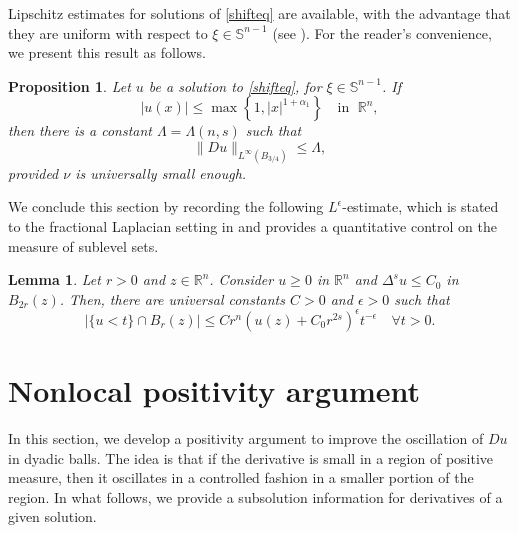 \documentclass[reqno,11pt]{amsart}
\newtheorem{lemma}{Lemma}[section]
\newtheorem{proposition}{Proposition}[section]
\numberwithin{equation}{section}
\numberwithin{equation}{section}
\begin{document}
Lipschitz estimates for solutions of \eqref{shifteq} are available, with the advantage that they are uniform with respect to \(\xi \in \mathbb{S}^{n-1}\) (see \cite[Lemma 2.2]{PT}). For the reader's convenience, we present this result as follows.

\begin{proposition}\label{ISHII-LIONS-QUE-N-VAMOS-FAZER}
Let $u$ be a solution to \eqref{shifteq}, for $\xi \in \mathbb{S}^{n-1}$. If 
$$
|u(x)| \leq \max\left\{1,|x|^{1+\alpha_1}\right\} \quad \mbox{in } \; \mathbb{R}^n,
$$
then there is a constant $\Lambda = \Lambda(n,s)$ such that
$$
\|Du\|_{L^\infty(B_{3/4})} \leq \Lambda,
$$
provided $\nu$ is universally small enough.
\end{proposition}

We conclude this section by recording the following $L^{\epsilon}$-estimate, which is stated to the fractional Laplacian setting in \cite[Theorem 10.4]{CS09} and provides a quantitative control on the measure of sublevel sets.
\begin{lemma}\label{lemma:CS09}
Let $r>0$ and $z \in \mathbb{R}^n$. Consider $u \geq 0$ in $\mathbb{R}^n$ and $\Delta^s u \leq C_0$ in $B_{2r}(z)$. Then, there are universal constants $C>0$ and $\epsilon>0$ such that
$$
    |\{u<t\}\cap B_r(z)| \leq Cr^n(u(z) + C_0r^{2s})^\epsilon t^{-\epsilon} \quad \forall t>0.
$$
\end{lemma}

\section{Nonlocal positivity argument}\label{pos-arg-section}

In this section, we develop a positivity argument to improve the oscillation of $Du$ in dyadic balls. The idea is that if the derivative is small in a region of positive measure, then it oscillates in a controlled fashion in a smaller portion of the region. In what follows, we provide a subsolution information for derivatives of a given solution. 
\end{document}
